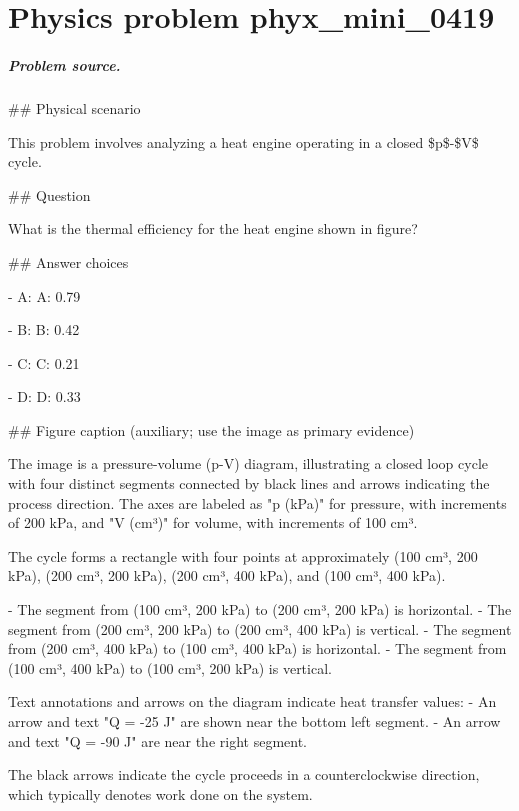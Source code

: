 
\chapter{Physics problem phyx\_mini\_0419}
\label{ch:PhyXMiniProblems_problem_phyx_mini_0419}

\paragraph{Problem source.}
\#\# Physical scenario

This problem involves analyzing a heat engine operating in a closed \$p\$-\$V\$ cycle.

\#\# Question

What is the thermal efficiency for the heat engine shown in figure?

\#\# Answer choices

- A: A: 0.79

- B: B: 0.42

- C: C: 0.21

- D: D: 0.33

\#\# Figure caption (auxiliary; use the image as primary evidence)

The image is a pressure-volume (p-V) diagram, illustrating a closed loop cycle with four distinct segments connected by black lines and arrows indicating the process direction. The axes are labeled as "p (kPa)" for pressure, with increments of 200 kPa, and "V (cm³)" for volume, with increments of 100 cm³.

The cycle forms a rectangle with four points at approximately (100 cm³, 200 kPa), (200 cm³, 200 kPa), (200 cm³, 400 kPa), and (100 cm³, 400 kPa).

- The segment from (100 cm³, 200 kPa) to (200 cm³, 200 kPa) is horizontal.
- The segment from (200 cm³, 200 kPa) to (200 cm³, 400 kPa) is vertical.
- The segment from (200 cm³, 400 kPa) to (100 cm³, 400 kPa) is horizontal.
- The segment from (100 cm³, 400 kPa) to (100 cm³, 200 kPa) is vertical. 

Text annotations and arrows on the diagram indicate heat transfer values:
- An arrow and text "Q = -25 J" are shown near the bottom left segment.
- An arrow and text "Q = -90 J" are near the right segment.

The black arrows indicate the cycle proceeds in a counterclockwise direction, which typically denotes work done on the system.

